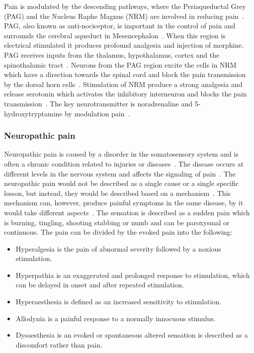 Pain is modulated by the descending pathways, where the Periaqueductal Grey (PAG) and the Nucleus Raphe Magnus (NRM) are involved in reducing pain~\cite{Steeds2013}. PAG, also known as anti-nociceptor, is important in the control of pain and surrounds the cerebral aqueduct in Mesencephalon~\cite{Steeds2013}. When this region is electrical stimulated it produces profound analgesia and injection of morphine. PAG receives inputs from the thalamus, hypothalamus, cortex and the spinothalamic tract~\cite{Steeds2013}. Neurons from the PAG region excite the cells in NRM which have a direction towards the spinal cord and block the pain transmission by the dorsal horn cells~\cite{Steeds2013}. Stimulation of NRM produce a strong analgesia and release serotonin which activates the inhibitory interneuron and blocks the pain transmission~\cite{Steeds2013}. The key neurotransmitter is noradrenaline and 5-hydroxytryptamine by modulation pain~\cite{Steeds2013}. 

\subsubsection{Neuropathic pain}
Neuropathic pain is caused by a disorder in the somatosensory system and is often a chronic condition related to injuries or diseases~\cite{Mindruta2013}. The disease occurs at different levels in the nervous system and affects the signaling of pain~\cite{Mindruta2013}. The neuropathic pain would not be described as a single cause or a single specific lesson, but instead, they would be described based on a mechanism~\cite{Mindruta2013}. This mechanism can, however, produce painful symptoms in the same disease, by it would take different aspects~\cite{Mindruta2013}.
The sensation is described as a sudden pain which is burning, tingling, shooting stabbing or numb and can be paroxysmal or continuous. The pain can be divided by the evoked pain into the following:

\begin{itemize}
	\item Hyperalgesia is the pain of abnormal severity followed by a noxious stimulation.
	\item Hyperpathia is an exaggerated and prolonged response to stimulation, which can be delayed in onset and after repeated stimulation. 
	\item Hyperaesthesia is defined as an increased sensitivity to stimulation. 
	\item Allodynia is a painful response to a normally innocuous stimulus. 
	\item Dysaesthesia is an evoked or spontaneous altered sensation is described as a discomfort rather than pain. 
\end{itemize}


